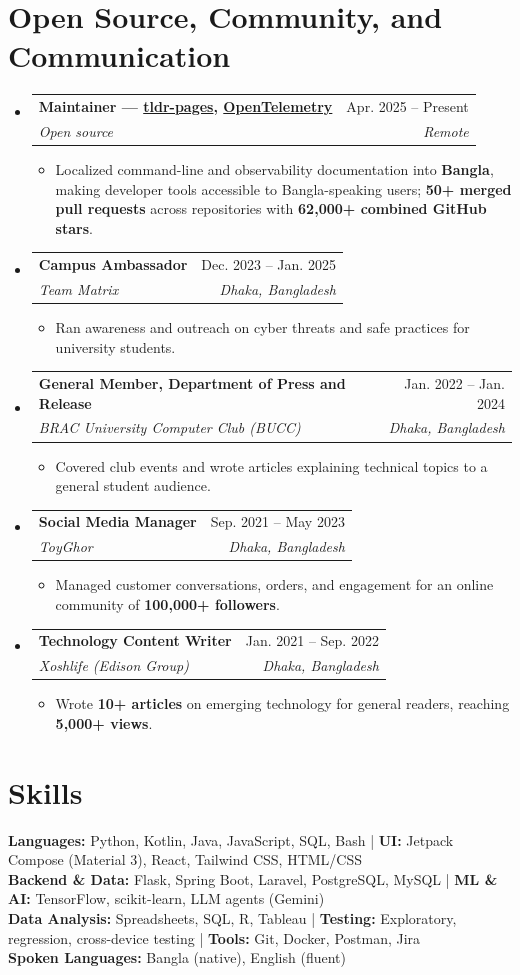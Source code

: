 \documentclass[a4paper]{article}
\makeatletter
\newcommand{\resumeItem}[1]{
  \item\small{
    {#1 \vspace{-2pt}}
  }
}
\newcommand{\resumeSubheading}[4]{
  \vspace{-2pt}\item
    \begin{tabular*}{0.97\textwidth}[t]{l@{\extracolsep{\fill}}r}
      \textbf{#1} & #2 \\
      \textit{\small#3} & \textit{\small #4} \\
    \end{tabular*}\vspace{-7pt}
}
\newcommand{\resumeSubHeadingListStart}{\begin{itemize}[leftmargin=0.15in, label={}]}
\newcommand{\resumeSubHeadingListEnd}{\end{itemize}}
\newcommand{\resumeItemListStart}{\begin{itemize}}
\newcommand{\resumeItemListEnd}{\end{itemize}\vspace{-5pt}}
\makeatother
\begin{document}
\section{Open Source, Community, and Communication}
  \resumeSubHeadingListStart
    \resumeSubheading
      {Maintainer --- \href{https://github.com/tldr-pages/tldr}{tldr-pages}, \href{https://github.com/open-telemetry}{OpenTelemetry}}{Apr. 2025 -- Present}
      {Open source}{Remote}
      \resumeItemListStart
        \resumeItem{Localized command-line and observability documentation into \textbf{Bangla}, making developer tools accessible to Bangla-speaking users; \textbf{50+ merged pull requests} across repositories with \textbf{62,000+ combined GitHub stars}.}
      \resumeItemListEnd
    \resumeSubheading
      {Campus Ambassador}{Dec. 2023 -- Jan. 2025}
      {Team Matrix}{Dhaka, Bangladesh}
      \resumeItemListStart
        \resumeItem{Ran awareness and outreach on cyber threats and safe practices for university students.}
      \resumeItemListEnd
    \resumeSubheading
      {General Member, Department of Press and Release}{Jan. 2022 -- Jan. 2024}
      {BRAC University Computer Club (BUCC)}{Dhaka, Bangladesh}
      \resumeItemListStart
        \resumeItem{Covered club events and wrote articles explaining technical topics to a general student audience.}
      \resumeItemListEnd
    \resumeSubheading
      {Social Media Manager}{Sep. 2021 -- May 2023}
      {ToyGhor}{Dhaka, Bangladesh}
      \resumeItemListStart
        \resumeItem{Managed customer conversations, orders, and engagement for an online community of \textbf{100,000+ followers}.}
      \resumeItemListEnd
    \resumeSubheading
      {Technology Content Writer}{Jan. 2021 -- Sep. 2022}
      {Xoshlife (Edison Group)}{Dhaka, Bangladesh}
      \resumeItemListStart
        \resumeItem{Wrote \textbf{10+ articles} on emerging technology for general readers, reaching \textbf{5,000+ views}.}
      \resumeItemListEnd
  \resumeSubHeadingListEnd


\section{Skills}
\begin{itemize}[leftmargin=0.15in, label={}]
\small{\item{
\textbf{Languages:} Python, Kotlin, Java, JavaScript, SQL, Bash \;|\;
\textbf{UI:} Jetpack Compose (Material 3), React, Tailwind CSS, HTML/CSS\\
\textbf{Backend \& Data:} Flask, Spring Boot, Laravel, PostgreSQL, MySQL \;|\;
\textbf{ML \& AI:} TensorFlow, scikit-learn, LLM agents (Gemini)\\
\textbf{Data Analysis:} Spreadsheets, SQL, R, Tableau \;|\;
\textbf{Testing:} Exploratory, regression, cross-device testing \;|\;
\textbf{Tools:} Git, Docker, Postman, Jira\\
\textbf{Spoken Languages:} Bangla (native), English (fluent)
}}
\end{itemize}
\end{document}
